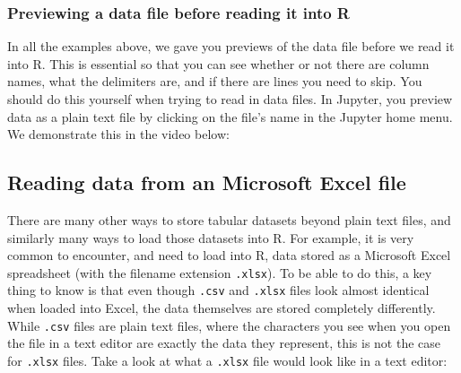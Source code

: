 \documentclass[
]{article}
\begin{document}
\hypertarget{previewing-a-data-file-before-reading-it-into-r}{%
\subsubsection{Previewing a data file before reading it into
R}\label{previewing-a-data-file-before-reading-it-into-r}}

In all the examples above, we gave you previews of the data file before
we read it into R. This is essential so that you can see whether or not
there are column names, what the delimiters are, and if there are lines
you need to skip. You should do this yourself when trying to read in
data files. In Jupyter, you preview data as a plain text file by
clicking on the file's name in the Jupyter home menu. We demonstrate
this in the video below:

\hypertarget{reading-data-from-an-microsoft-excel-file}{%
\subsection{Reading data from an Microsoft Excel
file}\label{reading-data-from-an-microsoft-excel-file}}

There are many other ways to store tabular datasets beyond plain text
files, and similarly many ways to load those datasets into R. For
example, it is very common to encounter, and need to load into R, data
stored as a Microsoft Excel spreadsheet (with the filename extension
\texttt{.xlsx}). To be able to do this, a key thing to know is that even
though \texttt{.csv} and \texttt{.xlsx} files look almost identical when
loaded into Excel, the data themselves are stored completely
differently. While \texttt{.csv} files are plain text files, where the
characters you see when you open the file in a text editor are exactly
the data they represent, this is not the case for \texttt{.xlsx} files.
Take a look at what a \texttt{.xlsx} file would look like in a text
editor:
\end{document}

